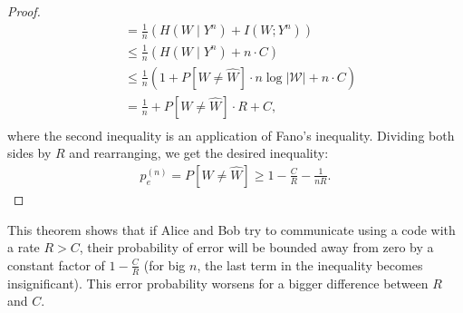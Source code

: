 \begin{proof}
\begin{align}
&= \frac{1}{n} \left( H(W \mid Y^n) + I(W;Y^n)\right) \nonumber\\
&\leq \frac{1}{n} \left( H(W \mid Y^n) + n \cdot C\right) \nonumber\\
&\leq \frac{1}{n} \left( 1 + P[W \neq \hat{W}] \cdot n \log |\mathcal{W}| + n \cdot C\right) \nonumber\\
&= \frac{1}{n} + P[W \neq \hat{W}] \cdot R + C, \nonumber\\
\end{align}
where the second inequality is an application of Fano's inequality. Dividing both sides by $R$ and rearranging, we get the desired inequality:
\begin{align}
p_e^{(n)} = P[W \neq \hat{W}] \geq 1 - \frac{C}{R} - \frac{1}{nR}.
\end{align}
\end{proof}
This theorem shows that if Alice and Bob try to communicate using a code with a rate $R > C$, their probability of error will be bounded away from zero by a constant factor of $1 - \frac{C}{R}$ (for big $n$, the last term in the inequality becomes insignificant). This error probability worsens for a bigger difference between $R$ and $C$.











